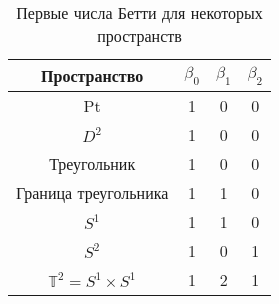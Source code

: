\begin{center}
	\begin{table}[!htbp]
		\centering
		\caption{Первые числа Бетти для некоторых пространств}
		\begin{tabular}{ |c|c c c| }
			\hline
			Пространство & $\beta_0$ & $\beta_1$ & $\beta_2$ \\ 
			\hline
			Pt & 1 & 0 & 0 \\ 
			$D^2$ & 1 & 0 & 0 \\ 
			Треугольник & 1 & 0 & 0 \\
			Граница треугольника & 1 & 1 & 0 \\
			$S^1$ & 1 & 1 & 0 \\
			$S^2$ & 1 & 0 & 1 \\
			$\mathbb{T}^2 = S^1 \times S^1$ & 1 & 2 & 1 \\
			\hline
		\end{tabular}
		\label{tabl:betti}
	\end{table}
\end{center}
